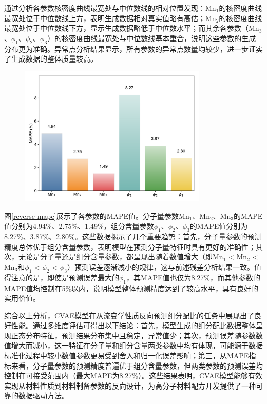 通过分析各参数核密度曲线最宽处与中位数线的相对位置发现：Mn$_1$的核密度曲线最宽处位于中位数线上方，表明生成数据相对真实值略有高估；Mn$_2$的核密度曲线最宽处位于中位数线下方，显示生成数据略低于中位数水平；而其余各参数（Mn$_3$、$\phi_1$、$\phi_2$、$\phi_3$）的核密度曲线最宽处与中位数线基本重合，说明这些参数的生成分布更为准确。异常点分析结果显示，所有参数的异常点数量均较少，进一步证实了生成数据的整体质量较高。
\begin{figure}[htbp]
  \centering
  \includegraphics[width=0.8\textwidth]{Fig/MAPE_bar_chart.pdf}
\end{figure}

图\ref{reverse-mape}展示了各参数的MAPE值。分子量参数Mn$_1$、Mn$_2$、Mn$_3$的MAPE值分别为4.94\%、2.75\%、1.49\%，组分含量参数$\phi_1$、$\phi_2$、$\phi_3$的MAPE值分别为8.27\%、3.87\%、2.80\%。这些数据揭示了几个重要趋势：首先，分子量参数的预测精度总体优于组分含量参数，表明模型在预测分子量特征时具有更好的准确性；其次，无论是分子量还是组分含量参数，都呈现出随着数值增大（即Mn$_1$ < Mn$_2$ < Mn$_3$和$\phi_1$ < $\phi_2$ < $\phi_3$）预测误差逐渐减小的规律，这与前述残差分析结果一致。值得注意的是，即使是预测误差最大的$\phi_1$，其MAPE值也仅为8.27\%，而其他参数的MAPE值均控制在5\%以内，说明模型整体预测精度达到了较高水平，具有良好的实用价值。

综合以上分析，CVAE模型在从流变学性质反向预测组分配比的任务中展现出了良好性能。通过多维度评估可得出以下结论：首先，模型生成的组分配比数据整体呈现正态分布特征，预测结果分布集中且稳定，异常值少；其次，预测误差随参数数值增大而减小，这一特征在分子量和组分含量两类参数中均有体现，可能源于数据标准化过程中较小数值参数更易受到舍入和归一化误差影响；第三，从MAPE指标来看，分子量参数的预测精度普遍优于组分含量参数，但两类参数的预测误差均控制在可接受范围内（最大MAPE为8.27\%）。这些结果表明，CVAE模型能够有效实现从材料性质到材料制备参数的反向设计，为高分子材料配方开发提供了一种可靠的数据驱动方法。

